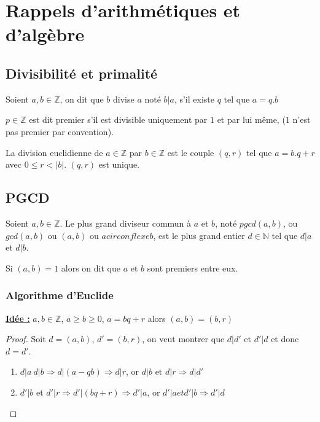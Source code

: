 \documentclass[a4paper, 10pt]{thesis}
\begin{document}
\section{Rappels d'arithmétiques et d'algèbre}
\subsection{Divisibilité et primalité}

\begin{df}
    Soient $a, b \in \mathbb{Z}$, on dit que $b$ divise $a$ noté $b|a$, s'il existe $q$ tel que $a =
    q . b$
\end{df}
\begin{df}
    $p \in \mathbb{Z}$ est dit premier s'il est divisible uniquement par $1$ et par lui même, ($1$
    n'est pas premier par convention).
\end{df}
\begin{df}
    La division euclidienne de $a \in \mathbb{Z}$ par $b \in \mathbb{Z}$ est le couple $(q, r)$ tel
    que $a = b.q + r$ avec $0 \leq r < |b|$. $(q, r)$ est unique.
\end{df}

\subsection{PGCD}

\begin{df}
    Soient $a, b \in \mathbb{Z}$. Le plus grand diviseur commun à $a$ et $b$, noté $pgcd(a,b)$, ou
    $gcd(a,b)$ ou $(a,b)$ ou $a circonflexe b$, est le plus grand entier $d \in \mathbb{N}$ tel que $d|a$ et
    $d|b$.
\end{df}

\begin{df}
    Si $(a,b) = 1$ alors on dit que $a$ et $b$ sont premiers entre eux.
\end{df}

\subsubsection{Algorithme d'Euclide}

\underline{\textbf{Idée :}} $a, b \in \mathbb{Z}$, $a \geq b \geq 0$, $a = bq + r$ alors $(a, b) =
(b, r)$

\begin{proof}
    Soit $d = (a,b)$, $d' = (b, r)$, on veut montrer que $d|d'$ et $d'|d$ et donc $d = d'$.
    \begin{enumerate}
        \item $d|a \  d|b \Rightarrow d | (a - qb) \Rightarrow d|r$, or $d|b \mbox{ et } d|r \Rightarrow d|d'$
        \item $d'|b$ et $d'|r \Rightarrow d'|(bq + r) \Rightarrow d'|a$, or $d'|a et d'|b
            \Rightarrow d'|d$
    \end{enumerate}
\end{proof}
\end{document}
